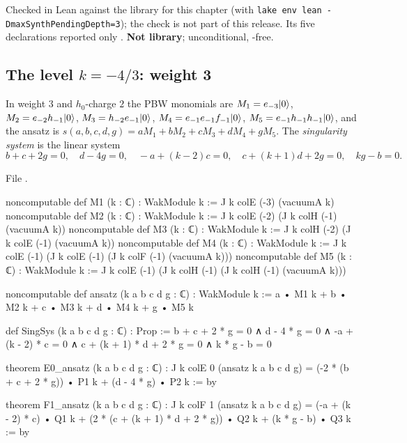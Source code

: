 \begin{status}
Checked in Lean against the library for this chapter (with \texttt{lake env lean -DmaxSynthPendingDepth=3}); the
check is not part of this release. Its five declarations reported only \lean{[propext, Classical.}\allowbreak{}\allowbreak\lean{sound]}.
\textbf{Not library}; unconditional, -free.
\end{status}

\subsection{The level \texorpdfstring{$k=-4/3$}{k=-4/3}: weight 3}

\begin{definition}\label{l08:def:ansatz3}
In weight $3$ and $h_0$-charge $2$ the PBW monomials are
$M_1 = e_{-3}|0\rangle$, $M_2 = e_{-2}h_{-1}|0\rangle$, $M_3 = h_{-2}e_{-1}|0\rangle$,
$M_4 = e_{-1}e_{-1}f_{-1}|0\rangle$, $M_5 = e_{-1}h_{-1}h_{-1}|0\rangle$, and the ansatz is
$s(a,b,c,d,g) = aM_1+bM_2+cM_3+dM_4+gM_5$. The \emph{singularity system} is the linear system
\begin{equation*}
  b+c+2g = 0,\quad d-4g=0,\quad -a+(k-2)c = 0,\quad c+(k+1)d+2g = 0,\quad kg-b = 0 .
\end{equation*}
\end{definition}

\noindent File .
\begin{leancode}
noncomputable def M1 (k : ℂ) : WakModule k := J k colE (-3) (vacuumA k)
noncomputable def M2 (k : ℂ) : WakModule k := J k colE (-2) (J k colH (-1) (vacuumA k))
noncomputable def M3 (k : ℂ) : WakModule k := J k colH (-2) (J k colE (-1) (vacuumA k))
noncomputable def M4 (k : ℂ) : WakModule k :=
  J k colE (-1) (J k colE (-1) (J k colF (-1) (vacuumA k)))
noncomputable def M5 (k : ℂ) : WakModule k :=
  J k colE (-1) (J k colH (-1) (J k colH (-1) (vacuumA k)))

noncomputable def ansatz (k a b c d g : ℂ) : WakModule k :=
  a • M1 k + b • M2 k + c • M3 k + d • M4 k + g • M5 k

def SingSys (k a b c d g : ℂ) : Prop :=
  b + c + 2 * g = 0 ∧ d - 4 * g = 0 ∧ -a + (k - 2) * c = 0
    ∧ c + (k + 1) * d + 2 * g = 0 ∧ k * g - b = 0

theorem E0_ansatz (k a b c d g : ℂ) :
    J k colE 0 (ansatz k a b c d g)
      = (-2 * (b + c + 2 * g)) • P1 k + (d - 4 * g) • P2 k := by

theorem F1_ansatz (k a b c d g : ℂ) :
    J k colF 1 (ansatz k a b c d g)
      = (-a + (k - 2) * c) • Q1 k + (2 * (c + (k + 1) * d + 2 * g)) • Q2 k
        + (k * g - b) • Q3 k := by
\end{leancode}

